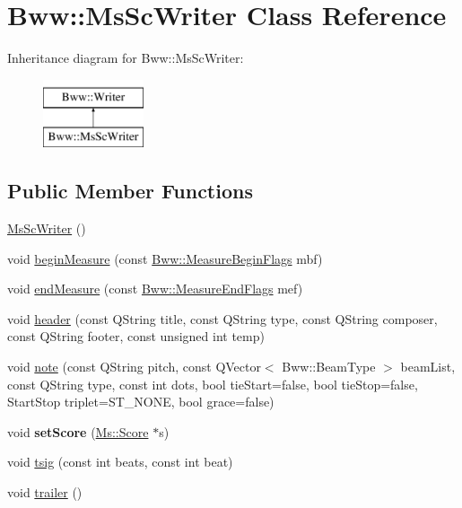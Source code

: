 \hypertarget{class_bww_1_1_ms_sc_writer}{}\section{Bww\+:\+:Ms\+Sc\+Writer Class Reference}
\label{class_bww_1_1_ms_sc_writer}
Inheritance diagram for Bww\+:\+:Ms\+Sc\+Writer\+:\begin{figure}[H]
\begin{center}
\leavevmode
\includegraphics[height=2.000000cm]{class_bww_1_1_ms_sc_writer}
\end{center}
\end{figure}
\subsection*{Public Member Functions}
\begin{DoxyCompactItemize}
\item 
\hyperlink{class_bww_1_1_ms_sc_writer_aebc249aecf32347d49866fdc06edaa6e}{Ms\+Sc\+Writer} ()
\item 
void \hyperlink{class_bww_1_1_ms_sc_writer_a95b57a18e804232fd724ce054dfd9d9d}{begin\+Measure} (const \hyperlink{struct_bww_1_1_measure_begin_flags}{Bww\+::\+Measure\+Begin\+Flags} mbf)
\item 
void \hyperlink{class_bww_1_1_ms_sc_writer_aaac2c3a7754b9e4932aed4b67b0c6e95}{end\+Measure} (const \hyperlink{struct_bww_1_1_measure_end_flags}{Bww\+::\+Measure\+End\+Flags} mef)
\item 
void \hyperlink{class_bww_1_1_ms_sc_writer_aa10c1014a6f22fd95ded294691b7517c}{header} (const Q\+String title, const Q\+String type, const Q\+String composer, const Q\+String footer, const unsigned int temp)
\item 
void \hyperlink{class_bww_1_1_ms_sc_writer_a14b90e89cf41fd7590a5ec89411a699f}{note} (const Q\+String pitch, const Q\+Vector$<$ Bww\+::\+Beam\+Type $>$ beam\+List, const Q\+String type, const int dots, bool tie\+Start=false, bool tie\+Stop=false, Start\+Stop triplet=S\+T\+\_\+\+N\+O\+NE, bool grace=false)
\item 
\mbox{\label{class_bww_1_1_ms_sc_writer_a022542fa7a888d53067abea6d4ad5518}} 
void {\bfseries set\+Score} (\hyperlink{class_ms_1_1_score}{Ms\+::\+Score} $\ast$s)
\item 
void \hyperlink{class_bww_1_1_ms_sc_writer_aa451ddaec741b6174bf43b0b11adf4de}{tsig} (const int beats, const int beat)
\item 
void \hyperlink{class_bww_1_1_ms_sc_writer_a8dcafaba05ea6dd04f11878e58f53bba}{trailer} ()
\end{DoxyCompactItemize}


